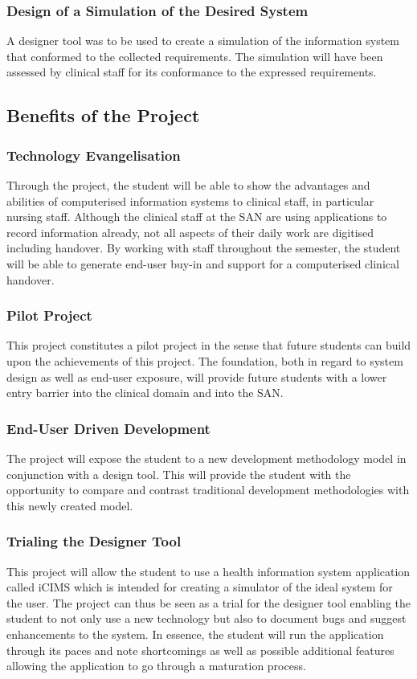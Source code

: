 \subsubsection{Design of a Simulation of the Desired System}
A designer tool was to be used to create a simulation of the information system that conformed to the collected requirements. The simulation will have been assessed by clinical staff for its conformance to the expressed requirements.

\subsection{Benefits of the Project}
\subsubsection{Technology Evangelisation}
Through the project, the student will be able to show the advantages and abilities of computerised information systems to clinical staff, in particular nursing staff. Although the clinical staff at the SAN are using applications to record information already, not all aspects of their daily work are digitised including handover. By working with staff throughout the semester, the student will be able to generate end-user buy-in and support for a computerised clinical handover.

\newpage
\subsubsection{Pilot Project}
This project constitutes a pilot project in the sense that future students can build upon the achievements of this project. The foundation, both in regard to system design as well as end-user exposure, will provide future students with a lower entry barrier into the clinical domain and into the SAN.

\subsubsection{End-User Driven Development}

The project will expose the student to a new development methodology model in conjunction with a design tool. This will provide the student with the opportunity to compare and contrast traditional development methodologies with this newly created model. 

\subsubsection{Trialing the Designer Tool}
This project will allow the student to use a health information system application called \gls{iCIMS} which is intended for creating a simulator of the ideal system for the user. The project can thus be seen as a trial for the designer tool enabling the student to not only use a new technology but also to document bugs and suggest enhancements to the system. In essence, the student will run the application through its paces and note shortcomings as well as possible additional features allowing the application to go through a maturation process. 